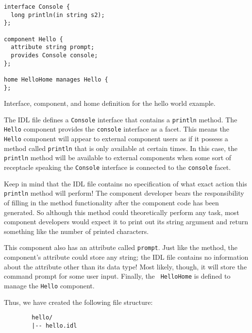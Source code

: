 \begin{Example}
\begin{minifbox}
\begin{small}
\begin{verbatim}
interface Console {
  long println(in string s2);
};

component Hello {
  attribute string prompt;
  provides Console console;
};

home HelloHome manages Hello {
};
\end{verbatim}
\end{small}
\end{minifbox}
\caption{Interface, component, and home definition for the hello world example.}
\label{example:one-component-idl}
\end{Example}

The IDL file defines a {\tt Console} interface that contains a {\tt println}
method. The {\tt Hello} component provides the {\tt console} interface as a
facet. This means the {\tt Hello} component will appear to external component
users as if it possess a method called {\tt println} that is only available at
certain times. In this case, the {\tt println} method will be available to
external components when some sort of receptacle speaking the {\tt Console}
interface is connected to the {\tt console} facet.

Keep in mind that the IDL file contains no specification of what exact action
this {\tt println} method will perform! The component developer bears the
responsibility of filling in the method functionality after the component code
has been generated. So although this method could theoretically perform any
task, most component developers would expect it to print out its string argument
and return something like the number of printed characters.

This component also has an attribute called {\tt prompt}. Just like the method,
the component's attribute could store any string; the IDL file contains no
information about the attribute other than its data type! Most likely, though,
it will store the command prompt for some user input. Finally, the {\tt
HelloHome} is defined to manage the {\tt Hello} component.

Thus, we have created the following file structure:
\begin{small}
\begin{verbatim}
        hello/
        |-- hello.idl
\end{verbatim}
\end{small}

